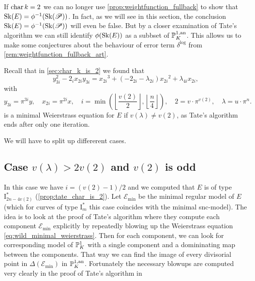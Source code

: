 If $\operatorname{char} k =2$ we can no longer use \cref{prop:weightfunction_fullback} to show that  $\sk(E) = \phi^{-1}(\sk(\mathscr P))$. 
In fact, as we will see in this section, the conclusion $\sk(E) = \phi^{-1}(\sk(\mathscr P))$ will even be false. 
But by a closer examination of Tate's algorithm we can still identify $\phi(\sk(E))$ as a subbset of $ \mathbb{P}_K^{1, \text{an}}$. 
This allows us to make some conjectures about the behaviour of error term $\delta^{\text{log}}$ from \cref{rem:weightfunction_fullback_art}. 


Recall that in \cref{sec:char_k_is_2} we found that \begin{equation}\label{eq:wild_minimal_weierstrass}
y_{3i}^2 - 2_i x_{2i} y_{3i} = {x_{2i}}^3 + (-2_{2i} - \lambda_{2i}) {x_{2i}}^2 + \lambda_{4i} x_{2i}
,\end{equation} 
with \[
	y_{3i} = \pi^{3i} y,\quad x_{2i} = \pi^{2i} x, \quad i = \min\left( \left\lfloor \frac{v(2)}{2}\right\rfloor, \left\lfloor \frac{n}{4} \right\rfloor  \right), \quad 2 = v\cdot \pi^{v(2)},\quad  \lambda = u \cdot \pi^{n}
.\] 
is a minimal Weierstrass equation for $E$ if $v(\lambda) \ne v(2)$, as Tate's algorithm ends after only one iteration. 

We will have to split up differerent cases. 
\subsection{Case $v(\lambda) > 2v(2)$ and $v(2)$ is odd} \label{sec:case_v_lambda_>_2_v_2_and_v_2_is_even}
In this case we have $i = (v(2) - 1) / 2$ and we computed that $E$ is of type $\mathrm I_{2n - 4v(2)}^*$ (\cref{prop:tate_char_is_2}).
Let $\mathscr E_\text{min} $ be the minimal regular model of $E$ (which for curves of type $\mathrm I_m^*$ this case coincides with the minimal snc-model).
The idea is to look at the proof of Tate's algorithm where they compute each component $\mathscr E_\text{min} $ explicitly by repeatedly blowing up the Weierstrass equation \eqref{eq:wild_minimal_weierstrass}. 
Then for each component, we can look for corresponding model of $\mathbb{P}^{1}_K$ with a single component and a domininating map between the components. 
That way we can find the image of every divisorial point in $\Delta(\mathscr E_\text{min} )$ in $\mathbb{P}^{1, \text{an}}_K$. 
Fortunately the necessary blowups are computed very clearly in the proof of Tate's algorithm in \cite[p.\ 369-379]{silvermanAdvancedTopicsArithmetic1994}

